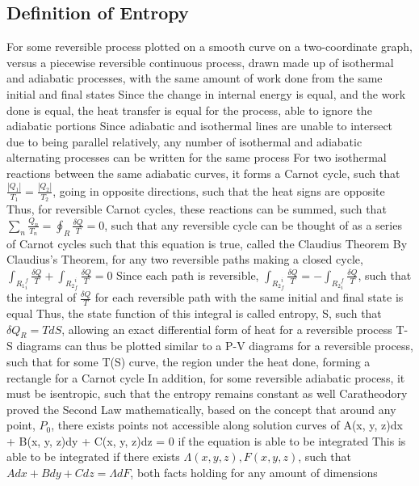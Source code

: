 \subsection{Definition of Entropy}
\begin{outline*}
\1 For some reversible process plotted on a smooth curve on a two-coordinate graph, versus a piecewise reversible continuous process, drawn made up of isothermal and adiabatic processes, with the same amount of work done from the same initial and final states
\2 Since the change in internal energy is equal, and the work done is equal, the heat transfer is equal for the process, able to ignore the adiabatic portions
\2 Since adiabatic and isothermal lines are unable to intersect due to being parallel relatively, any number of isothermal and adiabatic alternating processes can be written for the same process
\2 For two isothermal reactions between the same adiabatic curves, it forms a Carnot cycle, such that $\frac{|Q_1|}{T_1} = \frac{|Q_2|}{T_2}$, going in opposite directions, such that the heat signs are opposite
\3 Thus, for reversible Carnot cycles, these reactions can be summed, such that $\sum_n \frac{Q_n}{T_n} = \oint_R \frac{\delta Q}{T} = 0$, such that any reversible cycle can be thought of as a series of Carnot cycles such that this equation is true, called the Claudius Theorem
\1 By Claudius's Theorem, for any two reversible paths making a closed cycle, $\int_{R_1}_i^f \frac{\delta Q}{T} + \int_{R_2}_f^i \frac{\delta Q}{T} = 0$
\2 Since each path is reversible, $\int_{R_2}_f^i \frac{\delta Q}{T} = -\int_{R_2}_i^f \frac{\delta Q}{T}$, such that the integral of $\frac{\delta Q}{T}$ for each reversible path with the same initial and final state is equal
\2 Thus, the state function of this integral is called entropy, S, such that $\delta Q_R = TdS$, allowing an exact differential form of heat for a reversible process
\3 T-S diagrams can thus be plotted similar to a P-V diagrams for a reversible process, such that for some T(S) curve, the region under the heat done, forming a rectangle for a Carnot cycle
\3 In addition, for some reversible adiabatic process, it must be isentropic, such that the entropy remains constant as well
\1 Caratheodory proved the Second Law mathematically, based on the concept that around any point, $P_0$, there exists points not accessible along solution curves of A(x, y, z)dx + B(x, y, z)dy + C(x, y, z)dz = 0 if the equation is able to be integrated
\2 This is able to be integrated if there exists $\Lambda(x, y, z), F(x, y, z)$, such that $Adx + Bdy + Cdz = \Lambda dF$, both facts holding for any amount of dimensions

\end{outline*}
